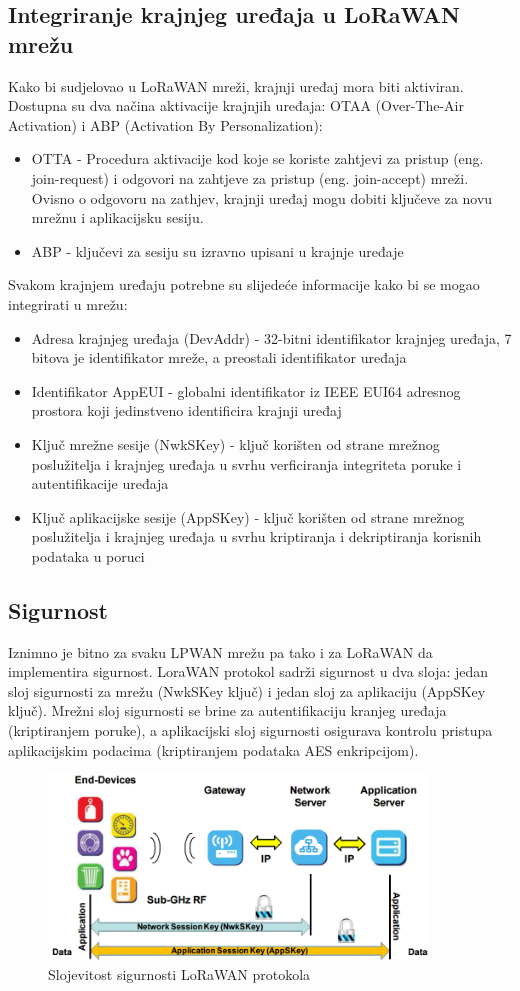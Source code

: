 \subsection{Integriranje krajnjeg uređaja u LoRaWAN mrežu}
\label{subsection:end_node_integration}
Kako bi sudjelovao u LoRaWAN mreži, krajnji uređaj mora biti aktiviran. Dostupna su dva načina aktivacije krajnjih uređaja: OTAA (Over-The-Air Activation) i ABP (Activation By Personalization):
\begin{itemize}
\item OTTA - Procedura aktivacije kod koje se koriste zahtjevi za pristup (eng. join-request) i odgovori na zahtjeve za pristup (eng. join-accept) mreži. Ovisno o odgovoru na zathjev, krajnji uređaj mogu dobiti ključeve za novu mrežnu i aplikacijsku sesiju.
\item ABP - ključevi za sesiju su izravno upisani u krajnje uređaje
\end{itemize}
Svakom krajnjem uređaju potrebne su slijedeće informacije kako bi se mogao integrirati u mrežu:
\begin{itemize}
\item Adresa krajnjeg uređaja (DevAddr) - 32-bitni identifikator krajnjeg uređaja, 7 bitova je identifikator mreže, a preostali identifikator uređaja
\item Identifikator AppEUI - globalni identifikator iz IEEE EUI64 adresnog prostora koji jedinstveno identificira krajnji uređaj
\item Ključ mrežne sesije (NwkSKey) - ključ korišten od strane mrežnog poslužitelja i krajnjeg uređaja u svrhu verficiranja integriteta poruke i autentifikacije uređaja
\item Ključ aplikacijske sesije (AppSKey) - ključ korišten od strane mrežnog poslužitelja i krajnjeg uređaja u svrhu kriptiranja i dekriptiranja korisnih podataka u poruci
\end{itemize}

\subsection{Sigurnost}
\label{subsection:security}
Iznimno je bitno za svaku LPWAN mrežu pa tako i za LoRaWAN da implementira sigurnost.
LoraWAN protokol sadrži sigurnost u dva sloja: jedan sloj sigurnosti za mrežu (NwkSKey ključ) i jedan sloj za aplikaciju (AppSKey ključ). Mrežni sloj sigurnosti se brine za autentifikaciju kranjeg uređaja (kriptiranjem poruke), a aplikacijski sloj sigurnosti osigurava kontrolu pristupa aplikacijskim podacima (kriptiranjem podataka AES enkripcijom).

\begin{figure}[ht!]
	\centering
	\includegraphics[width=0.9\textwidth]{images/security.png}
	\caption{Slojevitost sigurnosti LoRaWAN protokola}
	\label{img:security}
\end{figure}
